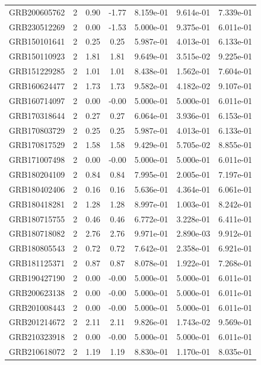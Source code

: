 \documentclass[12pt]{article}
\begin{document}
\begin{table}[h!]
{\begin{tabular}{l c c c c c c}
GRB200605762 & 2 & 0.90 & -1.77 & 8.159e-01 & 9.614e-01 & 7.339e-01 \\
GRB230512269 & 2 & 0.00 & -1.53 & 5.000e-01 & 9.375e-01 & 6.011e-01 \\
GRB150101641 & 2 & 0.25 & 0.25 & 5.987e-01 & 4.013e-01 & 6.133e-01 \\
GRB150110923 & 2 & 1.81 & 1.81 & 9.649e-01 & 3.515e-02 & 9.225e-01 \\
GRB151229285 & 2 & 1.01 & 1.01 & 8.438e-01 & 1.562e-01 & 7.604e-01 \\
GRB160624477 & 2 & 1.73 & 1.73 & 9.582e-01 & 4.182e-02 & 9.107e-01 \\
GRB160714097 & 2 & 0.00 & -0.00 & 5.000e-01 & 5.000e-01 & 6.011e-01 \\
GRB170318644 & 2 & 0.27 & 0.27 & 6.064e-01 & 3.936e-01 & 6.153e-01 \\
GRB170803729 & 2 & 0.25 & 0.25 & 5.987e-01 & 4.013e-01 & 6.133e-01 \\
GRB170817529 & 2 & 1.58 & 1.58 & 9.429e-01 & 5.705e-02 & 8.855e-01 \\
GRB171007498 & 2 & 0.00 & -0.00 & 5.000e-01 & 5.000e-01 & 6.011e-01 \\
GRB180204109 & 2 & 0.84 & 0.84 & 7.995e-01 & 2.005e-01 & 7.197e-01 \\
GRB180402406 & 2 & 0.16 & 0.16 & 5.636e-01 & 4.364e-01 & 6.061e-01 \\
GRB180418281 & 2 & 1.28 & 1.28 & 8.997e-01 & 1.003e-01 & 8.242e-01 \\
GRB180715755 & 2 & 0.46 & 0.46 & 6.772e-01 & 3.228e-01 & 6.411e-01 \\
GRB180718082 & 2 & 2.76 & 2.76 & 9.971e-01 & 2.890e-03 & 9.912e-01 \\
GRB180805543 & 2 & 0.72 & 0.72 & 7.642e-01 & 2.358e-01 & 6.921e-01 \\
GRB181125371 & 2 & 0.87 & 0.87 & 8.078e-01 & 1.922e-01 & 7.268e-01 \\
GRB190427190 & 2 & 0.00 & -0.00 & 5.000e-01 & 5.000e-01 & 6.011e-01 \\
GRB200623138 & 2 & 0.00 & -0.00 & 5.000e-01 & 5.000e-01 & 6.011e-01 \\
GRB201008443 & 2 & 0.00 & -0.00 & 5.000e-01 & 5.000e-01 & 6.011e-01 \\
GRB201214672 & 2 & 2.11 & 2.11 & 9.826e-01 & 1.743e-02 & 9.569e-01 \\
GRB210323918 & 2 & 0.00 & -0.00 & 5.000e-01 & 5.000e-01 & 6.011e-01 \\
GRB210618072 & 2 & 1.19 & 1.19 & 8.830e-01 & 1.170e-01 & 8.035e-01 \\

\end{tabular}}
\end{table}
\end{document}
